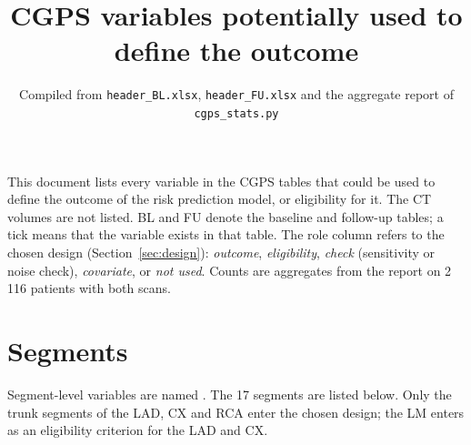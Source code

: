 \documentclass[11pt,a4paper]{article}
\title{CGPS variables potentially used to define the outcome}
\author{}
\date{Compiled from \texttt{header\_BL.xlsx}, \texttt{header\_FU.xlsx} and the aggregate report of \texttt{cgps\_stats.py}}
\begin{document}
\maketitle

\noindent This document lists every variable in the CGPS tables that could be used to define the outcome
of the risk prediction model, or eligibility for it. The CT volumes are not listed. BL and FU denote the
baseline and follow-up tables; a tick means that the variable exists in that table. The role column refers
to the chosen design (Section~\ref{sec:design}): \emph{outcome}, \emph{eligibility}, \emph{check}
(sensitivity or noise check), \emph{covariate}, or \emph{not used}. Counts are aggregates from the report
on 2\,116 patients with both scans.

\section{Segments}
\label{sec:segments}

Segment-level variables are named . The 17 segments are listed below.
Only the trunk segments of the LAD, CX and RCA enter the chosen design; the LM enters as an eligibility
criterion for the LAD and CX.
\end{document}
